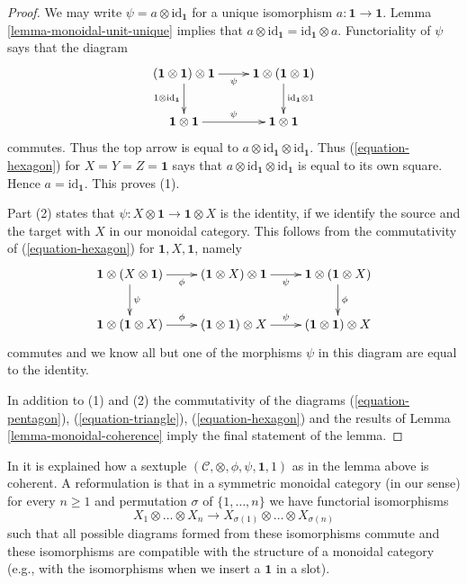 \begin{proof}
We may write $\psi = a \otimes \text{id}_\mathbf{1}$ for a unique
isomorphism $a : \mathbf{1} \to \mathbf{1}$.
Lemma \ref{lemma-monoidal-unit-unique} implies that
$a \otimes \text{id}_\mathbf{1} = \text{id}_\mathbf{1} \otimes a$.
Functoriality of $\psi$ says that the diagram
$$
\xymatrix{
(\mathbf{1} \otimes \mathbf{1}) \otimes \mathbf{1}
\ar[r]_\psi
\ar[d]_{1 \otimes \text{id}_\mathbf{1}} &
\mathbf{1} \otimes (\mathbf{1} \otimes \mathbf{1})
\ar[d]^{\text{id}_\mathbf{1} \otimes 1} \\
\mathbf{1} \otimes \mathbf{1}  \ar[r]^\psi &
\mathbf{1} \otimes \mathbf{1}
}
$$
commutes. Thus the top arrow is equal to
$a \otimes \text{id}_\mathbf{1} \otimes \text{id}_\mathbf{1}$.
Thus (\ref{equation-hexagon}) for $X = Y = Z = \mathbf{1}$ says that
$a \otimes \text{id}_\mathbf{1} \otimes \text{id}_\mathbf{1}$
is equal to its own square. Hence $a = \text{id}_\mathbf{1}$.
This proves (1).

\medskip\noindent
Part (2) states that $\psi : X \otimes \mathbf{1} \to \mathbf{1} \otimes X$
is the identity, if we identify the source and the target with $X$
in our monoidal category. This follows from the commutativity of
(\ref{equation-hexagon}) for $\mathbf{1}, X, \mathbf{1}$, namely
$$
\xymatrix{
\mathbf{1} \otimes (X \otimes \mathbf{1}) \ar[r]_\phi \ar[d]^\psi &
(\mathbf{1} \otimes X) \otimes \mathbf{1} \ar[r]_\psi &
\mathbf{1} \otimes (\mathbf{1} \otimes X) \ar[d]^\phi \\
\mathbf{1} \otimes (\mathbf{1} \otimes X) \ar[r]^\phi &
(\mathbf{1} \otimes \mathbf{1}) \otimes X \ar[r]^\psi &
(\mathbf{1} \otimes \mathbf{1}) \otimes X
}
$$
commutes and we know all but one of the morphisms $\psi$
in this diagram are equal to the identity.

\medskip\noindent
In addition to (1) and (2) the commutativity of the diagrams
(\ref{equation-pentagon}), (\ref{equation-triangle}), (\ref{equation-hexagon})
and the results of Lemma \ref{lemma-monoidal-coherence}
imply the final statement of the lemma.
\end{proof}

\noindent
In \cite[Theorem 5.1]{associativity} it is explained how a sextuple
$(\mathcal{C}, \otimes, \phi, \psi, \mathbf{1}, 1)$ as in the lemma above
is coherent. A reformulation is that in a symmetric monoidal category
(in our sense) for every $n \geq 1$ and permutation $\sigma$
of $\{1, \ldots, n\}$ we have functorial isomorphisms
$$
X_1 \otimes \ldots \otimes X_n
\to
X_{\sigma(1)} \otimes \ldots \otimes X_{\sigma(n)}
$$
such that all possible diagrams formed from these isomorphisms
commute and these isomorphisms are compatible with the structure
of a monoidal category (e.g., with the isomorphisms when we insert
a $\mathbf{1}$ in a slot).

